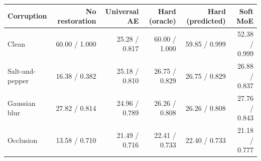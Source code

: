 \begin{tabular}{lrrrrr}
\toprule
Corruption & No restoration & Universal AE & Hard (oracle) & Hard (predicted) & Soft MoE \\
\midrule
Clean & 60.00 / 1.000 & 25.28 / 0.817 & 60.00 / 1.000 & 59.85 / 0.999 & 52.38 / 0.999 \\
Salt-and-pepper & 16.38 / 0.382 & 25.18 / 0.810 & 26.75 / 0.829 & 26.75 / 0.829 & 26.88 / 0.837 \\
Gaussian blur & 27.82 / 0.814 & 24.96 / 0.789 & 26.26 / 0.808 & 26.26 / 0.808 & 27.76 / 0.843 \\
Occlusion & 13.58 / 0.710 & 21.49 / 0.716 & 22.41 / 0.733 & 22.40 / 0.733 & 21.18 / 0.777 \\
\bottomrule
\end{tabular}
